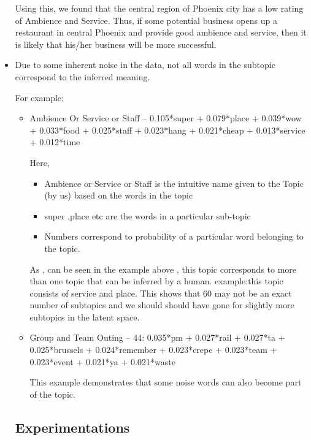 \documentclass[12pt]{article} %
\begin{document}
\begin{itemize}
Using this, we found that the central region of Phoenix city has a low rating of Ambience and Service. Thus, if some potential business opens up a restaurant in central Phoenix and provide good ambience and service, then it is likely that his/her business will be more successful.
 
\item Due to some inherent noise in the data, not all words in the subtopic correspond to the inferred meaning.

For example:
	\begin{itemize}
	\item Ambience Or Service or Staff -- 0.105*super + 0.079*place + 0.039*wow + 0.033*food + 0.025*staff + 0.023*hang + 0.021*cheap + 0.013*service + 0.012*time
	
	Here,
		\begin{itemize}
		\item Ambience or Service or Staff is the intuitive name given  to the Topic (by us) based on the words in the topic
		\item super ,place etc are the words in a particular sub-topic 
		\item Numbers correspond to probability of a particular word belonging to the topic.
		\end{itemize}
		
	As , can be seen in the example above , this topic corresponds to more than one topic that can be inferred by a human. example:this topic consists of service and place. This shows that 60 may not be an exact number of subtopics and we should should have gone for slightly more subtopics in the latent space.\\ 
	
	\item Group and Team Outing -- 44: 0.035*pm + 0.027*rail + 0.027*ta + 0.025*brussels + 0.024*remember + 0.023*crepe + 0.023*team + 0.023*event + 0.021*ya + 0.021*waste
	
	This example demonstrates that some noise words can also become part of the topic.
	\end{itemize}

\subsection{Experimentations}

\end{itemize}
\end{document}
